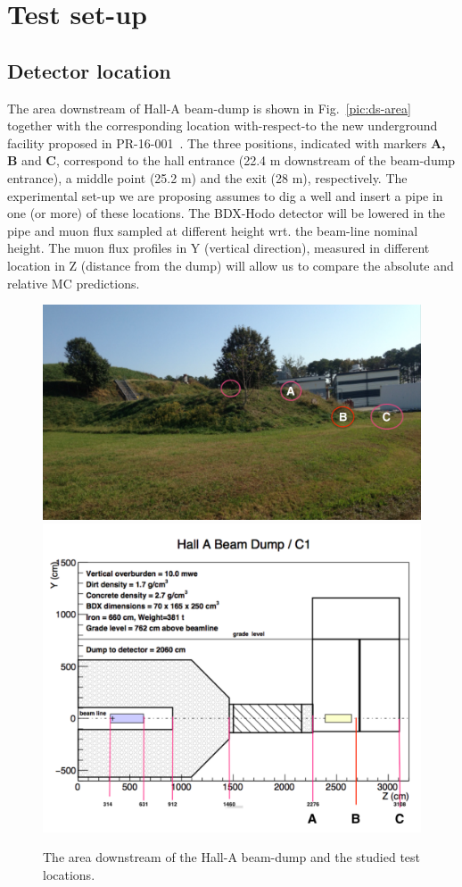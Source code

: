 \section{Test set-up}
\label{sec:setup}
\subsection{Detector location}
The area downstream of Hall-A beam-dump is shown in Fig.~\ref{pic:ds-area}  together with the corresponding location with-respect-to  
the new  underground facility proposed in PR-16-001~\cite{bdx-proposal}. The three positions, indicated with markers {\bf A, B}  and {\bf C},  correspond to the hall entrance (22.4 m downstream of the beam-dump entrance), a middle point (25.2 m) and the exit (28 m), respectively. The experimental set-up we are proposing  assumes to dig a well and insert a pipe in one (or more) of these locations. The BDX-Hodo detector will be lowered in the pipe and muon flux sampled at different height wrt. the beam-line nominal height. The muon flux profiles in Y (vertical direction), measured in  different location in Z (distance from the dump) will allow us to compare the absolute and relative MC predictions. 
\begin{figure}[h!] 
\center  
\includegraphics[width=11.5cm]{figs/ds-area.pdf}   
\includegraphics[width=11.5cm]{figs/test-plan.pdf}  
\caption{The area downstream of the Hall-A beam-dump and the studied test locations.}
\label{fig:ds-area}
\end{figure}


